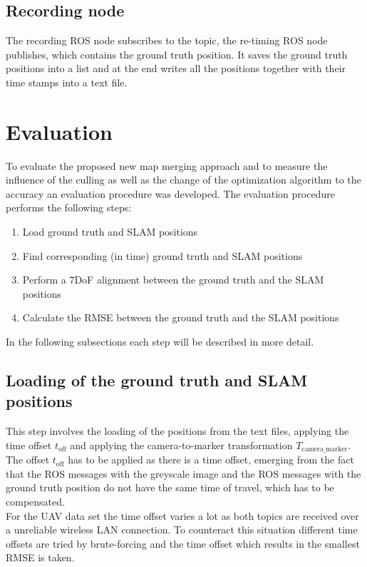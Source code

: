 \subsection{Recording node}
\label{subsec:record_node}
The recording \ac{ROS} node subscribes to the topic, the re-timing \ac{ROS} node publishes, which contains the ground truth position. It saves the ground truth positions into a list and at the end writes all the positions together with their time stamps into a text file.

\section{Evaluation}
To evaluate the proposed new map merging approach and to measure the influence of the culling as well as the change of the optimization algorithm to the accuracy an evaluation procedure was developed. The evaluation procedure performs the following steps:

\begin{enumerate}
  \item Load ground truth and \ac{SLAM} positions
  \item Find corresponding (in time) ground truth and \ac{SLAM} positions
  \item Perform a 7DoF alignment between the ground truth and the \ac{SLAM} positions
  \item Calculate the \acf{RMSE} between the ground truth and the \ac{SLAM} positions
\end{enumerate}

In the following subsections each step will be described in more detail.

\subsection{Loading of the ground truth and \ac{SLAM} positions}
This step involves the loading of the positions from the text files, applying the time offset $t_{\text{off}}$ and applying the camera-to-marker transformation $T_{\text{camera\_marker}}$.\\

The offset $t_{\text{off}}$ has to be applied as there is a time offset, emerging from the fact that the \ac{ROS} messages with the greyscale image and the \ac{ROS} messages with the ground truth position do not have the same time of travel, which has to be compensated.\\
For the \ac{UAV} data set the time offset varies a lot as both topics are received over a unreliable wireless LAN connection. To counteract this situation different time offsets are tried by brute-forcing and the time offset which results in the smallest \ac{RMSE} is taken.\\ 

